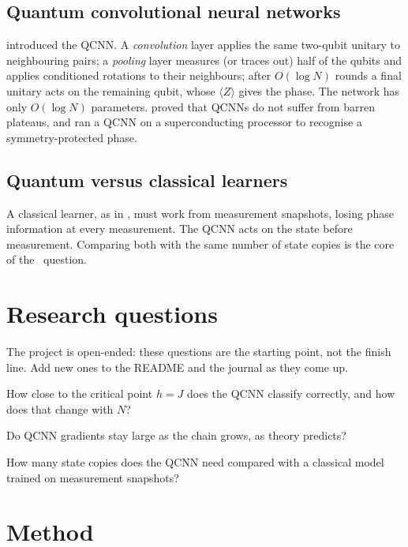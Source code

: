 \documentclass[11pt,a4paper]{article}
\begin{document}
\subsection{Quantum convolutional neural networks}
\citet{cong2019} introduced the QCNN. A \emph{convolution} layer applies the same two-qubit unitary to
neighbouring pairs; a \emph{pooling} layer measures (or traces out) half of the qubits and applies
conditioned rotations to their neighbours; after $O(\log N)$ rounds a final unitary acts on the
remaining qubit, whose $\langle Z\rangle$ gives the phase. The network has only $O(\log N)$ parameters.
\citet{pesah2021} proved that QCNNs do not suffer from barren plateaus, and \citet{herrmann2022}
ran a QCNN on a superconducting processor to recognise a symmetry-protected phase.

\subsection{Quantum versus classical learners}
A classical learner, as in \citet{carrasquilla2017}, must work from measurement snapshots, losing
phase information at every measurement. The QCNN acts on the state before measurement. Comparing both
with the same number of state copies is the core of the \QQ\ question.

\section{Research questions}
The project is open-ended: these questions are the starting point, not the finish line. Add new
ones to the README and the journal as they come up.

\begin{rqlist}
  \item How close to the critical point $h=J$ does the QCNN classify correctly, and how does that change with $N$?
  \item Do QCNN gradients stay large as the chain grows, as theory predicts?
  \item How many state copies does the QCNN need compared with a classical model trained on measurement snapshots?
\end{rqlist}

\section{Method}
\end{document}
